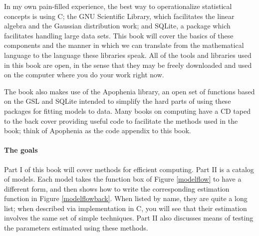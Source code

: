 In my own pain-filled experience, the best way to operationalize
statistical concepts is using C; the GNU Scientific Library,  which
facilitates the linear algebra and the Gaussian distribution work;
and SQLite, a package which facilitates handling large data sets. This
book will cover the basics of these components and the manner in which
we can translate from the mathematical language to the language these
libraries speak.  All of the tools and libraries
used in this book are open, in the sense that they may be freely
downloaded and used on the computer where you do your work right now.

The book also makes use of the Apophenia library, an open set of
functions based on the GSL and SQLite intended to simplify the hard
parts of using these packages for fitting models to data. Many books on
computing have a CD taped to the back cover providing useful code to
facilitate the methods used in the book; think of Apophenia as the code
appendix to this book.

\paragraph{The goals}
Part I of this book will cover methods for efficient computing. Part II
is a catalog of models. Each model takes the
function box of Figure \ref{modelflow} to have a different form, and
then shows how to write the corresponding estimation function in Figure
\ref{modelflowback}. When listed by name, they are quite a long list; when
described via implementation in C, you will see that their estimation
involves the same set of simple techniques.  Part II also discusses
means of testing the parameters estimated using these methods.

